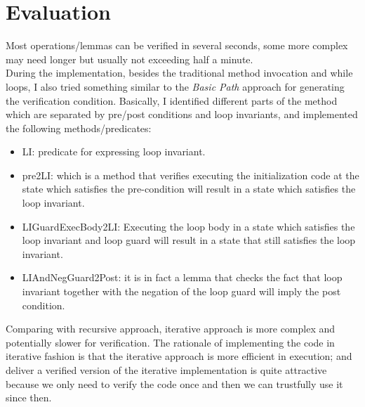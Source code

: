 \section*{Evaluation}
Most operations/lemmas can be verified in several seconds, some more complex may need longer but usually not exceeding half a minute.\\

During the implementation, besides the traditional method invocation and while loops, I also tried something similar to the \emph{Basic Path} approach for generating the verification condition. Basically, I identified different parts of the method which are separated by pre/post conditions and loop invariants, and implemented the following methods/predicates:\\

\begin{itemize}
\item LI: predicate for expressing loop invariant.
\item pre2LI: which is a method that verifies executing the initialization code at the state which satisfies the pre-condition will result in a state which satisfies the loop invariant.

\item LIGuardExecBody2LI: Executing the loop body in a state which satisfies the loop invariant and loop guard will result in a state that still satisfies the loop invariant.

\item LIAndNegGuard2Post: it is in fact a lemma that checks the fact that loop invariant together with the negation of the loop guard will imply the post condition.
\end{itemize}

Comparing with recursive approach, iterative approach is more complex and potentially slower for verification. The rationale of implementing the code in iterative fashion is that the iterative approach is more efficient in execution; and deliver a verified version of the iterative implementation is quite attractive because we only need to verify the code once and then we can trustfully use it since then.